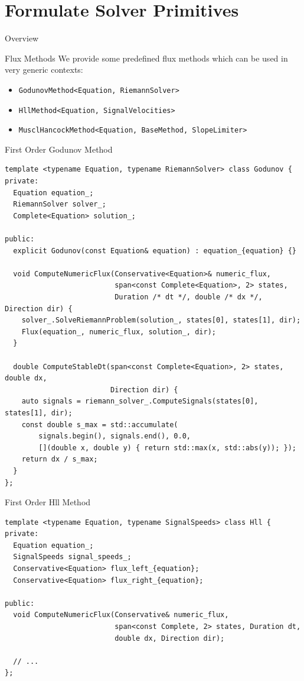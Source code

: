 \documentclass[ucs,9pt]{beamer}
\begin{document}
\section{Formulate Solver Primitives}
\begin{frame}{Overview}
\tableofcontents[currentsection]
\end{frame}

\begin{frame}{Flux Methods}
We provide some predefined flux methods which can be used in very generic contexts:

\begin{itemize}
	\item \texttt{GodunovMethod<Equation, RiemannSolver>}
	\item \texttt{HllMethod<Equation, SignalVelocities>}
	\item \texttt{MusclHancockMethod<Equation, BaseMethod, SlopeLimiter>}
\end{itemize}
\end{frame}

\begin{frame}[fragile]{First Order Godunov Method}
\begin{lstlisting}
template <typename Equation, typename RiemannSolver> class Godunov {
private:
  Equation equation_;
  RiemannSolver solver_;
  Complete<Equation> solution_;

public:
  explicit Godunov(const Equation& equation) : equation_{equation} {}

  void ComputeNumericFlux(Conservative<Equation>& numeric_flux,
                          span<const Complete<Equation>, 2> states,
                          Duration /* dt */, double /* dx */, Direction dir) {
    solver_.SolveRiemannProblem(solution_, states[0], states[1], dir);
    Flux(equation_, numeric_flux, solution_, dir);
  }

  double ComputeStableDt(span<const Complete<Equation>, 2> states, double dx,
                         Direction dir) {
    auto signals = riemann_solver_.ComputeSignals(states[0], states[1], dir);
    const double s_max = std::accumulate(
        signals.begin(), signals.end(), 0.0,
        [](double x, double y) { return std::max(x, std::abs(y)); });
    return dx / s_max;
  }
};
\end{lstlisting}
\end{frame}

\begin{frame}[fragile]{First Order Hll Method}
\begin{lstlisting}
template <typename Equation, typename SignalSpeeds> class Hll {
private:
  Equation equation_;
  SignalSpeeds signal_speeds_;
  Conservative<Equation> flux_left_{equation};
  Conservative<Equation> flux_right_{equation};

public:
  void ComputeNumericFlux(Conservative& numeric_flux,
                          span<const Complete, 2> states, Duration dt,
                          double dx, Direction dir);

  // ...
};
\end{lstlisting}
\end{frame}
\end{document}

